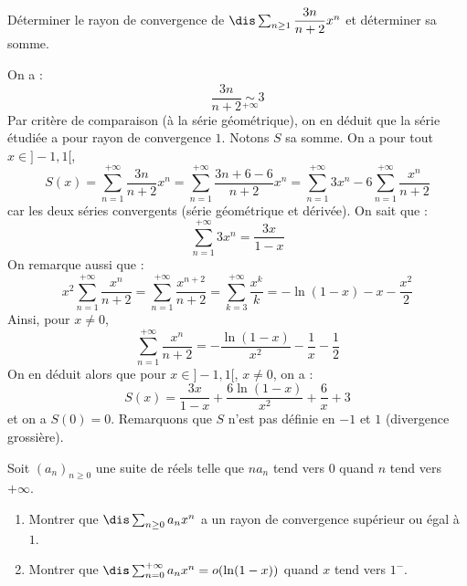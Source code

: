 \documentclass[a4paper,10pt]{report}
\begin{document}
\begin{Exa} Déterminer le rayon de convergence de $\dis \sum_{n \geq 1} \dfrac{3n}{n+2} x^n$ et déterminer sa somme.
\end{Exa}

\corr On a :
$$  \dfrac{3n}{n+2} \underset{+ \infty}{\sim} 3$$
Par critère de comparaison (à la série géométrique), on en déduit que la série étudiée a pour rayon de convergence $1$. Notons $S$ sa somme. On a pour tout $x \in ]-1,1[$,
$$ S(x) = \sum_{n=1}^{+ \infty}  \dfrac{3n}{n+2} x^n = \sum_{n=1}^{+ \infty}  \dfrac{3n+6-6}{n+2} x^n = \sum_{n=1}^{+ \infty} 3x^n - 6 \sum_{n=1}^{+ \infty} \dfrac{x^n}{n+2}$$
car les deux séries convergents (série géométrique et dérivée). On sait que :
$$ \sum_{n=1}^{+ \infty} 3x^n = \dfrac{3x}{1-x}$$
On remarque aussi que :
$$ x^2 \sum_{n=1}^{+ \infty} \dfrac{x^n}{n+2} = \sum_{n=1}^{+ \infty} \dfrac{x^{n+2}}{n+2} = \sum_{k=3}^{+\infty} \dfrac{x^k}{k} = - \ln(1-x) -x - \dfrac{x^2}{2}   $$
Ainsi, pour $x \neq 0$,
$$ \sum_{n=1}^{+ \infty} \dfrac{x^n}{n+2} = - \dfrac{\ln(1-x)}{x^2} - \dfrac{1}{x} - \dfrac{1}{2}$$
On en déduit alors que pour $x \in ]-1,1[$, $x \neq 0$, on a :
$$ S(x) =  \dfrac{3x}{1-x}  + \dfrac{6\ln(1-x)}{x^2} + \dfrac{6}{x} +3$$
et on a $S(0)= 0$. Remarquons que $S$ n'est pas définie en $-1$ et $1$ (divergence grossière).


\begin{Exa} Soit $(a_n)_{n \geq 0}$ une suite de réels telle que $na_n$ tend vers $0$ quand $n$ tend vers $+ \infty$.
\begin{enumerate}
\item Montrer que $\dis \sum_{n \geq 0} a_n x^n$ a un rayon de convergence supérieur ou égal à $1$.
\item Montrer que $\dis \sum_{n=0}^{+ \infty} a_n x^n = o(\ln(1-x))$ quand $x$ tend vers $1^{-}$.
\end{enumerate}
\end{Exa}
\end{document}
